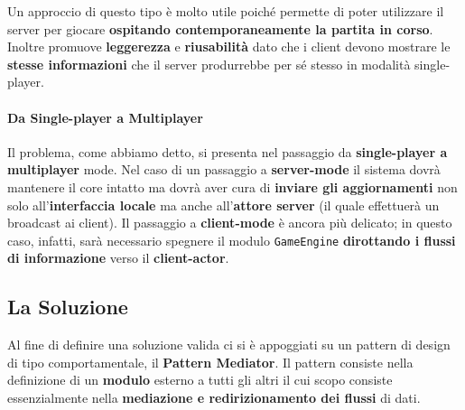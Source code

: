 Un approccio di questo tipo è molto utile poiché permette di poter utilizzare il server per giocare \textbf{ospitando contemporaneamente la partita in corso}. Inoltre promuove \textbf{leggerezza} e \textbf{riusabilità} dato che i client devono mostrare le \textbf{stesse informazioni} che il server produrrebbe per sé stesso in modalità single-player.

\paragraph{Da Single-player a Multiplayer}
Il problema, come abbiamo detto, si presenta nel passaggio da \textbf{single-player a multiplayer} mode. Nel caso di un passaggio a \textbf{server-mode} il sistema dovrà mantenere il core intatto ma dovrà aver cura di \textbf{inviare gli aggiornamenti} non solo all'\textbf{interfaccia locale} ma anche all'\textbf{attore server} (il quale effettuerà un broadcast ai client). Il passaggio a \textbf{client-mode} è ancora più delicato; in questo caso, infatti, sarà necessario spegnere il modulo \texttt{GameEngine} \textbf{dirottando i flussi di informazione} verso il \textbf{client-actor}.

\subsection{La Soluzione}
Al fine di definire una soluzione valida ci si è appoggiati su un pattern di design di tipo comportamentale, il \textbf{Pattern Mediator}. Il pattern consiste nella definizione di un \textbf{modulo} esterno a tutti gli altri il cui scopo consiste essenzialmente nella \textbf{mediazione e redirizionamento dei flussi} di dati.

